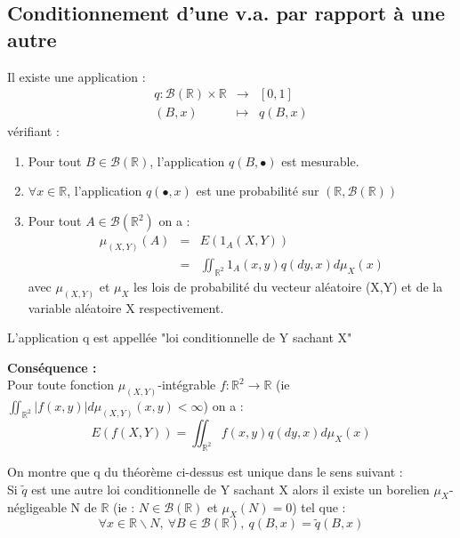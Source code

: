 \subsection{Conditionnement d'une v.a. par rapport à une autre}
\begin{theo}[de Doob]
Il existe une application :
\begin{eqnarray*}
q : \mathcal{B}(\mathbb{R})\times\mathbb{R} &\to& [0,1] \\
		(B,x) 	 &\mapsto& q(B,x)
\end{eqnarray*}
vérifiant : \begin{enumerate}
\item Pour tout $B\in \mathcal{B}(\mathbb{R})$, l'application $q(B,\bullet)$ est mesurable.
\item $\forall x\in \mathbb{R}$, l'application $q(\bullet,x)$ est une probabilité sur $(\mathbb{R},\mathcal{B}(\mathbb{R}))$
\item Pour tout $A\in\mathcal{B}(\mathbb{R}^2)$ on a : 
\begin{eqnarray*}
\mu_{(X,Y)}(A) &=& E(1_{A}(X,Y)) \\
	&=& \iint_{\mathbb{R}^2} 1_A(x,y) q(dy,x) d\mu_X(x) 
\end{eqnarray*}
avec $\mu_{(X,Y)}$ et $\mu_X$ les lois de probabilité du vecteur aléatoire (X,Y) et de la variable aléatoire X respectivement.
\end{enumerate}
\end{theo}

\begin{Def}
L'application q est appellée "loi conditionnelle de Y sachant X"
\end{Def}

\noindent \textbf{Conséquence :} \\
Pour toute fonction $\mu_{(X,Y)}$-intégrable $f:\mathbb{R}^2 \to \mathbb{R}$ (ie $\iint_{\mathbb{R}^2} |f(x,y)| d\mu_{(X,Y)}(x,y) <\infty$) on a :
\[E(f(X,Y)) = \iint_{\mathbb{R}^2} f(x,y) q(dy,x) d\mu_X(x)\]

\begin{rmq}
On montre que q du théorème ci-dessus est unique dans le sens suivant : \\
Si $\tilde{q}$ est une autre loi conditionnelle de Y sachant X alors il existe un borelien $\mu_X$-négligeable N de $\mathbb{R}$ (ie : $N\in\mathcal{B}(\mathbb{R})$ et $\mu_X(N)=0$) tel que : 
\[\forall x\in\mathbb{R}\backslash N,\ \forall B\in\mathcal{B}(\mathbb{R}),\ q(B,x)=\tilde{q}(B,x)\]
\end{rmq}

